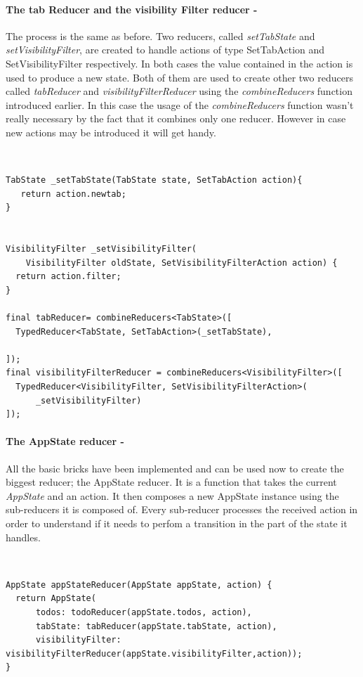 \paragraph{The tab Reducer and the visibility Filter reducer - }
\label{subpar:todo_app_bloc_core_state}
The process is the same as before. Two reducers, called \textit{setTabState} and \textit{setVisibilityFilter}, are created to handle actions of type SetTabAction and SetVisibilityFilter respectively. In both cases the value contained in the action is used to produce a new state. Both of them are used to create other two reducers called \textit{tabReducer} and \textit{visibilityFilterReducer} using the \textit{combineReducers} function introduced earlier. In this case the usage of the \textit{combineReducers} function wasn’t really necessary by the fact that it combines only one reducer. However in case new actions may be introduced it will get handy.
\begin{code}
\mbox{}\\
 \mbox{}
		\label{code:2.14}
\begin{verbatim}
TabState _setTabState(TabState state, SetTabAction action){
   return action.newtab;
}


VisibilityFilter _setVisibilityFilter(
    VisibilityFilter oldState, SetVisibilityFilterAction action) {
  return action.filter;
}

final tabReducer= combineReducers<TabState>([
  TypedReducer<TabState, SetTabAction>(_setTabState),

]);
final visibilityFilterReducer = combineReducers<VisibilityFilter>([
  TypedReducer<VisibilityFilter, SetVisibilityFilterAction>(
      _setVisibilityFilter)
]);
\end{verbatim}
\mbox{}
\end{code}

\paragraph{The AppState reducer - }
\label{subpar:todo_app_bloc_core_state}
All the basic bricks have been implemented and can be used now to create the biggest reducer; the AppState reducer. It is a function that takes the current \textit{AppState} and an action. It then composes a new AppState instance using the sub-reducers it is composed of. Every sub-reducer processes the received action in order to understand if it needs to perfom a transition in the part of the state it handles. 
\begin{code}
\mbox{}\\
 \mbox{}
		\label{code:2.14}
\begin{verbatim}
AppState appStateReducer(AppState appState, action) {
  return AppState(
      todos: todoReducer(appState.todos, action),
      tabState: tabReducer(appState.tabState, action),
      visibilityFilter: visibilityFilterReducer(appState.visibilityFilter,action));
}
\end{verbatim}
\mbox{}
\end{code}

